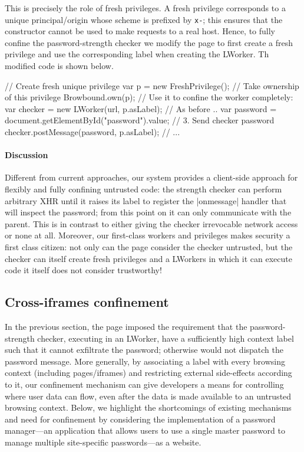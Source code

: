 This is precisely the role of fresh privileges.
%
A fresh privilege corresponds to a unique principal/origin whose
scheme is prefixed by \texttt{x-}; this ensures that the \xhr{}
constructor cannot be used to make requests to a real host.
%
Hence, to fully confine the password-strength checker we modify the
 page to first create a fresh privilege and use the
corresponding label when creating the LWorker.
%
Th modified code is shown below.
\begin{jscode}
// Create fresh unique privilege
var p = new FreshPrivilege();
// Take ownership of this privilege
Browbound.own(p);
// Use it to confine the worker completely:
var checker = new LWorker(url, p.asLabel);
// As before ..
var password = 
 document.getElementById("password").value;
// 3. Send checker password 
checker.postMessage(password, p.asLabel);
// ...
\end{jscode}

\paragraph{Discussion}
Different from current approaches, our system provides a client-side
approach for flexibly and fully confining untrusted code:
%
the strength checker can perform arbitrary XHR until it raises its
label to register the \js|onmessage| handler that will inspect the
password; from this point on it can only communicate with the parent.
%
This is in contrast to either giving the checker irrevocable network
access or none at all.
%
Moreover, our first-class workers and privileges makes security a
first class citizen: not only can the page consider the checker
untrusted, but the checker can itself create fresh privileges and a
LWorkers in which it can execute code it itself does not consider
trustworthy!

\subsection{Cross-iframes confinement}
\label{sec:system:iframe}

In the previous section, the  page imposed the
requirement that the password-strength checker, executing in an
LWorker, have a sufficiently high context label such that it cannot
exfiltrate the password; otherwise \sys{} would not dispatch the
password message.
%
More generally, by associating a label with every browsing context
(including pages/iframes) and restricting external side-effects
according to it, our confinement mechanism can give developers a means
for controlling where user data can flow, even after the data is made
available to an untrusted browsing context.
%
Below, we highlight the shortcomings of existing mechanisms and need
for confinement by considering the implementation of a password
manager---an application that allows users to use a single master
password to manage multiple site-specific passwords---as a website.

